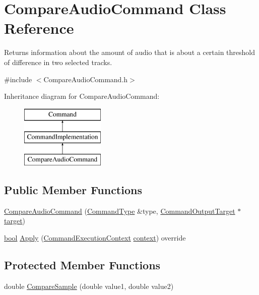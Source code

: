 \hypertarget{class_compare_audio_command}{}\section{Compare\+Audio\+Command Class Reference}
\label{class_compare_audio_command}


Returns information about the amount of audio that is about a certain threshold of difference in two selected tracks.  




{\ttfamily \#include $<$Compare\+Audio\+Command.\+h$>$}

Inheritance diagram for Compare\+Audio\+Command\+:\begin{figure}[H]
\begin{center}
\leavevmode
\includegraphics[height=3.000000cm]{class_compare_audio_command}
\end{center}
\end{figure}
\subsection*{Public Member Functions}
\begin{DoxyCompactItemize}
\item 
\hyperlink{class_compare_audio_command_a32dc26e881f9bf9b9cd81b87f45561e5}{Compare\+Audio\+Command} (\hyperlink{class_command_type}{Command\+Type} \&type, \hyperlink{class_command_output_target}{Command\+Output\+Target} $\ast$\hyperlink{lib_2expat_8h_a15a257516a87decb971420e718853137}{target})
\item 
\hyperlink{mac_2config_2i386_2lib-src_2libsoxr_2soxr-config_8h_abb452686968e48b67397da5f97445f5b}{bool} \hyperlink{class_compare_audio_command_af0c87195292eb8509a5945efedb9a91f}{Apply} (\hyperlink{class_command_execution_context}{Command\+Execution\+Context} \hyperlink{structcontext}{context}) override
\end{DoxyCompactItemize}
\subsection*{Protected Member Functions}
\begin{DoxyCompactItemize}
\item 
double \hyperlink{class_compare_audio_command_a0d8d87e6308ffdd4dddcba45caab2953}{Compare\+Sample} (double value1, double value2)
\end{DoxyCompactItemize}
